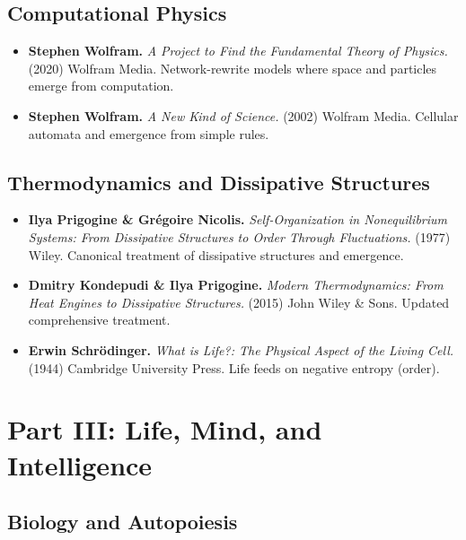 \documentclass[
  openright]{book}
\begin{document}
\subsection{Computational Physics}\label{computational-physics}

\begin{itemize}
\item
  \textbf{Stephen Wolfram.} \emph{A Project to Find the Fundamental
  Theory of Physics.} (2020) Wolfram Media. Network-rewrite models where
  space and particles emerge from computation.
\item
  \textbf{Stephen Wolfram.} \emph{A New Kind of Science.} (2002) Wolfram
  Media. Cellular automata and emergence from simple rules.
\end{itemize}

\subsection{Thermodynamics and Dissipative
Structures}\label{thermodynamics-and-dissipative-structures-1}

\begin{itemize}
\item
  \textbf{Ilya Prigogine \& Grégoire Nicolis.} \emph{Self-Organization
  in Nonequilibrium Systems: From Dissipative Structures to Order
  Through Fluctuations.} (1977) Wiley. Canonical treatment of
  dissipative structures and emergence.
\item
  \textbf{Dmitry Kondepudi \& Ilya Prigogine.} \emph{Modern
  Thermodynamics: From Heat Engines to Dissipative Structures.} (2015)
  John Wiley \& Sons. Updated comprehensive treatment.
\item
  \textbf{Erwin Schrödinger.} \emph{What is Life?: The Physical Aspect
  of the Living Cell.} (1944) Cambridge University Press. Life feeds on
  negative entropy (order).
\end{itemize}

\section{Part III: Life, Mind, and
Intelligence}\label{part-iii-life-mind-and-intelligence}

\subsection{Biology and Autopoiesis}\label{biology-and-autopoiesis}
\end{document}
